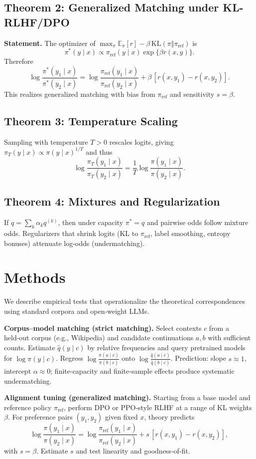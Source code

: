 \documentclass[11pt]{article}
\begin{document}
\subsection{Theorem 2: Generalized Matching under KL-RLHF/DPO}
\textbf{Statement.} The optimizer of $\max_\pi \mathbb{E}_{\pi}[r]-\beta\,\mathrm{KL}(\pi\Vert\pi_{\text{ref}})$ is
\[\pi^{*}(y\mid x)\propto \pi_{\text{ref}}(y\mid x)\exp\{\beta r(x,y)\}.\]
Therefore
\[\log\frac{\pi^{*}(y_1\mid x)}{\pi^{*}(y_2\mid x)}=
\log\frac{\pi_{\text{ref}}(y_1\mid x)}{\pi_{\text{ref}}(y_2\mid x)}+\beta\,[r(x,y_1)-r(x,y_2)].\]
This realizes generalized matching with bias from $\pi_{\text{ref}}$ and sensitivity $s=\beta$.

\subsection{Theorem 3: Temperature Scaling}
Sampling with temperature $T>0$ rescales logits, giving $\pi_T(y\mid x)\propto \pi(y\mid x)^{1/T}$ and thus
\[\log\frac{\pi_T(y_1\mid x)}{\pi_T(y_2\mid x)}=\frac{1}{T}\log\frac{\pi(y_1\mid x)}{\pi(y_2\mid x)}.\]

\subsection{Theorem 4: Mixtures and Regularization}
If $q=\sum_k \alpha_k q^{(k)}$, then under capacity $\pi^{*}=q$ and pairwise odds follow mixture odds. Regularizers that shrink logits (KL to $\pi_{\text{ref}}$, label smoothing, entropy bonuses) attenuate log-odds (undermatching).

\section{Methods}
We describe empirical tests that operationalize the theoretical correspondences using standard corpora and open‑weight LLMs.

\textbf{Corpus–model matching (strict matching).} Select contexts \(c\) from a held‑out corpus (e.g., Wikipedia) and candidate continuations \(a,b\) with sufficient counts. Estimate \(\hat q(y\mid c)\) by relative frequencies and query pretrained models for \(\log \pi(y\mid c)\). Regress \(\log\frac{\pi(a\mid c)}{\pi(b\mid c)}\) onto \(\log\frac{\hat q(a\mid c)}{\hat q(b\mid c)}\). Prediction: slope \(s\approx1\), intercept \(\alpha\approx0\); finite‑capacity and finite‑sample effects produce systematic undermatching.

\textbf{Alignment tuning (generalized matching).} Starting from a base model and reference policy \(\pi_{\text{ref}}\), perform DPO or PPO‑style RLHF at a range of KL weights \(\beta\). For preference pairs \((y_1,y_2)\) given fixed \(x\), theory predicts
\[\log\frac{\pi(y_1\mid x)}{\pi(y_2\mid x)}=\log\frac{\pi_{\text{ref}}(y_1\mid x)}{\pi_{\text{ref}}(y_2\mid x)}+s\,[r(x,y_1)-r(x,y_2)],\]
with \(s=\beta\). Estimate \(s\) and test linearity and goodness‑of‑fit.
\end{document}
